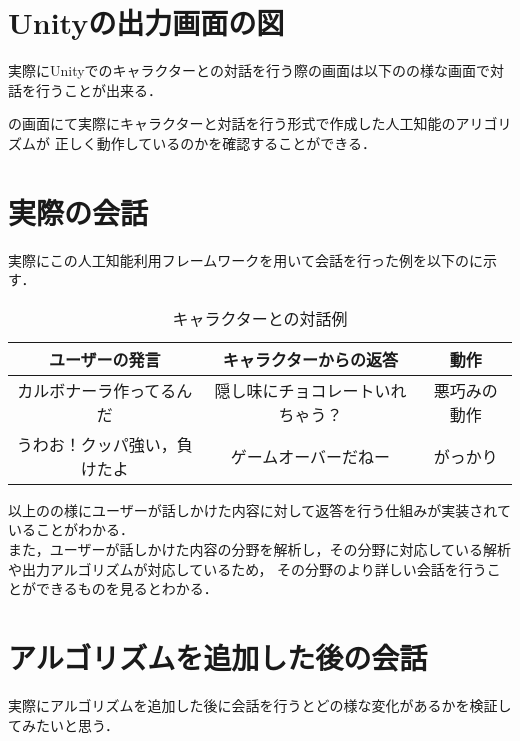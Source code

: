 
\section{Unityの出力画面の図}
実際にUnityでのキャラクターとの対話を行う際の画面は以下のの様な画面で対話を行うことが出来る．


の画面にて実際にキャラクターと対話を行う形式で作成した人工知能のアリゴリズムが
正しく動作しているのかを確認することができる．\\


\section{実際の会話}
実際にこの人工知能利用フレームワークを用いて会話を行った例を以下のに示す．\\

\begin{table}[tbh]
	\caption{キャラクターとの対話例} \label{tab:Chat}
	\begin{center}
		\begin{tabular}[htb]{c|c|c}
		\hline
		ユーザーの発言 & キャラクターからの返答 & 動作 \\
		\hline
		カルボナーラ作ってるんだ & 隠し味にチョコレートいれちゃう？ & 悪巧みの動作 \\
		うわお！クッパ強い，負けたよ & ゲームオーバーだねー & がっかり \\
		\hline
		\end{tabular}
	\end{center}
\end{table}

以上のの様にユーザーが話しかけた内容に対して返答を行う仕組みが実装されていることがわかる．\\

また，ユーザーが話しかけた内容の分野を解析し，その分野に対応している解析や出力アルゴリズムが対応しているため，
その分野のより詳しい会話を行うことができるものを見るとわかる．\\


\section{アルゴリズムを追加した後の会話}\label{sec:addAl}
実際にアルゴリズムを追加した後に会話を行うとどの様な変化があるかを検証してみたいと思う．\\

